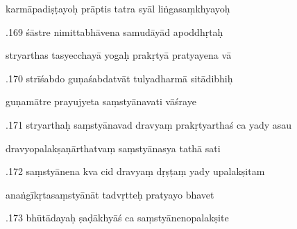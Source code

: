 \documentclass[article,12pt,a4paper]{memoir}%
\newcounter{parCount}
\begin{document}
	  
	  \pstart \leavevmode%
	karmāpadiṣṭayoḥ prāptis tatra syāl liṅgasaṃkhyayoḥ 
	{}
	\pend%
      

	  
	  \pstart {}.169 śāstre nimittabhāvena samudāyād apoddhṛtaḥ 
	{}
	\pend%
      

	  
	  \pstart \leavevmode%
	stryarthas tasyecchayā yogaḥ prakṛtyā pratyayena vā 
	{}
	\pend%
      

	  
	  \pstart {}.170 strīśabdo guṇaśabdatvāt tulyadharmā sitādibhiḥ 
	{}
	\pend%
      

	  
	  \pstart \leavevmode%
	guṇamātre prayujyeta saṃstyānavati vāśraye 
	{}
	\pend%
      

	  
	  \pstart {}.171 stryarthaḥ saṃstyānavad dravyaṃ   prakṛtyarthaś ca yady asau 
	{}
	\pend%
      

	  
	  \pstart \leavevmode%
	dravyopalakṣaṇārthatvaṃ saṃstyānasya tathā sati 
	{}
	\pend%
      

	  
	  \pstart {}.172 saṃstyānena kva cid dravyaṃ dṛṣṭaṃ yady upalakṣitam 
	{}
	\pend%
      

	  
	  \pstart \leavevmode%
	anaṅgīkṛtasaṃstyānāt tadvṛtteḥ pratyayo bhavet 
	{}
	\pend%
      

	  
	  \pstart {}.173 bhūtādayaḥ ṣaḍākhyāś ca   saṃstyānenopalakṣite 
	{}
	\pend%
      
\end{document}
